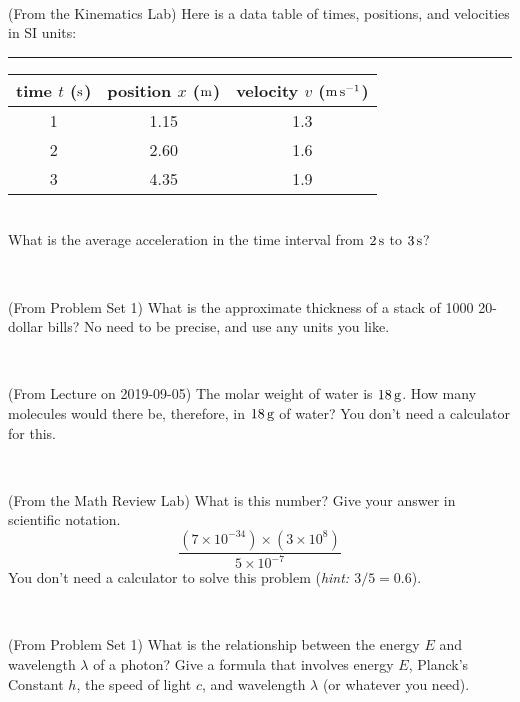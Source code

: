 \documentclass[12pt, letterpaper]{article}
\begin{document}
\vfill ~

\begin{problem} (From the Kinematics Lab)
Here is a data table of times, positions, and velocities in SI units:\\
\rule{1.0in}{0pt}\begin{tabular}{c|c|c}
time $t$ ($\mathrm{s}$) & position $x$ ($\mathrm{m}$) & velocity $v$ ($\mathrm{m}\,\mathrm{s}^{-1}$) \\
\hline
1 & 1.15 & 1.3 \\
2 & 2.60 & 1.6 \\
3 & 4.35 & 1.9 \\
\hline
\end{tabular}\\
What is the average acceleration in the time interval from $2\,\mathrm{s}$ to $3\,\mathrm{s}$?
\end{problem}


\vfill ~


\clearpage


\begin{problem} (From Problem Set 1)
What is the approximate thickness of a stack of 1000 20-dollar bills?
No need to be precise, and use any units you like.
\end{problem}


\vfill ~

\begin{problem} (From Lecture on 2019-09-05)
The molar weight of water is $18\,\mathrm{g}$. How many molecules would there
be, therefore, in $18\,\mathrm{g}$ of water? You don't need a calculator for
this.
\end{problem}


\vfill ~

\begin{problem} (From the Math Review Lab)
What is this number? Give your answer in scientific notation.
$$
\frac{(7\times10^{-34})\times(3\times10^8)}{5\times10^{-7}}
$$
You don't need a calculator to solve this problem (\textit{hint: $3/5=0.6$}).
\end{problem}


\vfill ~

\begin{problem} (From Problem Set 1)
What is the relationship between the energy $E$ and wavelength
$\lambda$ of a photon? Give a formula that involves energy $E$,
Planck's Constant $h$, the speed of light $c$, and wavelength
$\lambda$ (or whatever you need).
\end{problem}

\vfill ~
\end{document}
